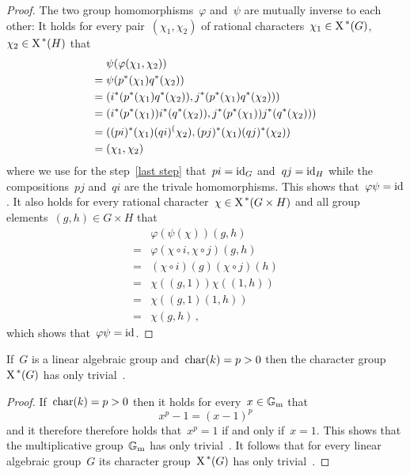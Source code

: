 \begin{proof}
  The two group homomorphisms~$\varphi$ and~$\psi$ are mutually inverse to each other:
  It holds for every pair~$(\chi_1, \chi_2)$ of rational characters~$\chi_1 \in \operatorname{X}^{\,*}(G)$,~$\chi_2 \in \operatorname{X}^{\,*}(H)$ that
  \begin{align}
       &  \psi(\varphi(\chi_1, \chi_2)) \notag  \\
    ={}&  \psi( p^*(\chi_1) q^*(\chi_2) ) \notag  \\
    ={}&  ( i^*( p^*(\chi_1) q^*(\chi_2) ), j^*( p^*(\chi_1) q^*(\chi_2) ) )  \notag  \\
    ={}&  ( i^*(p^*(\chi_1)) i^*(q^*(\chi_2)) , j^*(p^*(\chi_1)) j^*(q^*(\chi_2)) ) \notag  \\
    ={}&  ( (pi)^*(\chi_1) (qi)^(\chi_2), (pj)^*(\chi_1) (qj)^*(\chi_2) ) \notag  \\
    ={}&  ( \chi_1, \chi_2) \label{last step}
  \end{align}
  where we use for the step~\eqref{last step} that~$pi = \operatorname{id}_G$ and~$qj = \operatorname{id}_H$ while the compositions~$pj$ and~$qi$ are the trivale homomorphisms.
  This shows that~$\varphi \psi = \operatorname{id}$.
  It also holds for every rational character~$\chi \in \operatorname{X}^{\,*}(G \times H)$ and all group elements~$(g,h) \in G \times H$ that
  \begin{align*}
     {}&  \varphi(\psi(\chi))(g,h)  \\
    ={}&  \varphi(\chi \circ i, \chi \circ j)(g,h)  \\
    ={}&  (\chi \circ i)(g) (\chi \circ j)(h) \\
    ={}&  \chi((g,1)) \chi((1,h)) \\
    ={}&  \chi((g,1)(1,h))  \\
    ={}&  \chi(g,h) \,,
  \end{align*}
  which shows that~$\varphi \psi = \operatorname{id}$.
\end{proof}


\begin{lemma}
  \label{trivial torsion in char p}
  If~$G$ is a linear algebraic group and~$\operatorname{char}(k) = p > 0$ then the character group~$\operatorname{X}^{\,*}(G)$ has only trivial~.
\end{lemma}


\begin{proof}
  If~$\operatorname{char}(k) = p > 0$ then it holds for every~$x \in \mathbb{G}_{\text{m}}$ that
  \[
      x^p - 1
    = (x - 1)^p
  \]
  and it therefore therefore holds that~$x^p = 1$ if and only if~$x = 1$.
  This shows that the multiplicative group~$\mathbb{G}_{\text{m}}$ has only trivial~.
  It follows that for every linear algebraic group~$G$ its character group~$\operatorname{X}^{\,*}(G)$ has only trivial~.
\end{proof}


